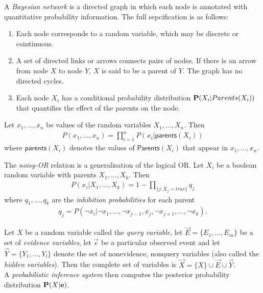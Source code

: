 \documentclass{article}
\begin{document}
\begin{definition}[R\&N p. 511]
	A \emph{Bayesian network} is a directed graph in which each node is
	annotated with quantitative probability information. The full sepcification
	is as follows:
	\begin{enumerate}
		\item Each node corresponds to a random variable, which may be discrete or cointinuous.
		\item A set of directed links or arrows connects pairs of nodes. If there is an arrow
		      from node $X$ to node $Y$, $X$ is said to be a parent of $Y$. The graph has no directed cycles.
		\item Each node $X_i$ has a conditional probability distribution $\P(X_i|Parents(X_i))$ that
		      quantifies the effect of the parents on the node.
	\end{enumerate}
\end{definition}

\begin{proposition}[R\&N p. 513]
	Let $x_1, ..., x_n$ be values of the random variables $X_1,...,X_n$. Then
	\begin{align*}
		P(x_1, ..., x_n) = \prod_{i=1}^n P(x_i | \textsf{parents}(X_i))
	\end{align*}
	where $\textsf{parents}(X_i)$ denotes the values of $\textsf{Parents}(X_i)$ that
	appear in $x_1, ..., x_n$.
\end{proposition}

\begin{definition}[R\&N p. 518]
	The \emph{noisy-OR} relation is a generalisation of the logical OR. Let $X_i$ be a boolean
	random variable with parents $X_1, ..., X_k$. Then
	\begin{align*}
		P(x_i|X_1, ..., X_k) = 1 - \prod_{\{j:X_j = true\}} q_j
	\end{align*}
	where $q_1,...,q_k$ are the \emph{inhibition probabilities} for each parent
	\begin{align*}
		q_j = P(\neg x_i | \neg x_1, ..., \neg x_{j-1}, x_j, \neg x_{j+1}, ..., \neg x_k).
	\end{align*}
\end{definition}

\begin{definition}[R\&N p. 522]
	Let $X$ be a random variable called the \emph{query variable}, let $\vec E=\{E_1,...,E_m\}$
	be a set of \emph{evidence variables}, let $\vec e$ be a particular observed event and let
	$\vec Y=\{Y_1, ..., Y_l\}$ denote the set of nonevidence, nonquery variables (also
	called the \emph{hidden variables}). Then the complete set of variables is
	$\vec X = \{X\}\cup \vec E \cup \vec Y$.\\
	A \emph{probabilistic inference system} then computes the posterior probability distribution
	$\P(X|\vec e)$.
\end{definition}
\end{document}

